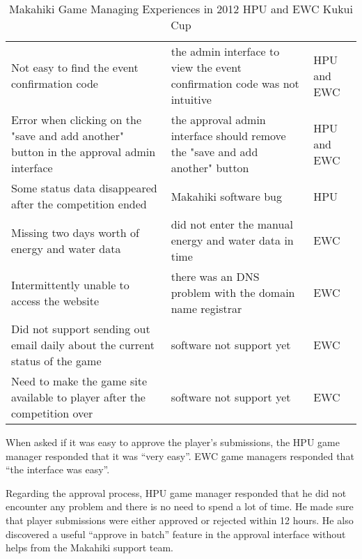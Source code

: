 \begin{table}[ht!]
  \centering
  \begin{tabular}{|P{0.4\columnwidth}|P{0.4\columnwidth}|P{0.1\columnwidth}|}
    \hline
    \centering {} &
    \centering {} & 
     \\
    \hline
    Not easy to find the event confirmation code  & the admin interface to view the event confirmation code was not intuitive & HPU and EWC \\
    \hline
    Error when clicking on the "save and add another" button in the approval admin interface &  the approval admin interface should remove the "save and add another" button & HPU and EWC \\
    \hline
    Some status data disappeared after the competition ended & Makahiki software bug & HPU\\
    \hline
    Missing two days worth of energy and water data & did not enter the manual energy and water data in time & EWC\\
    \hline
    Intermittently unable to access the website  & there was an DNS problem with the domain name registrar & EWC\\
    \hline
    Did not support sending out email daily about the current status of the game & software not support yet & EWC \\
    \hline
    Need to make the game site available to player after the competition over & software not support yet & EWC \\
    \hline
  \end{tabular}
  \caption{Makahiki Game Managing Experiences in 2012 HPU and EWC Kukui Cup}
  \label{fig:hpu-ewc-manage}
\end{table}

When asked if it was easy to approve the player's submissions, the HPU game manager responded that it was ``very easy''. EWC game managers responded that ``the interface was easy''.

Regarding the approval process, HPU game manager responded that he did not encounter any problem and there is no need to spend a lot of time. He made sure that player submissions were either approved or rejected within 12 hours. He also discovered a useful ``approve in batch'' feature in the approval interface without helps from the Makahiki support team.  

